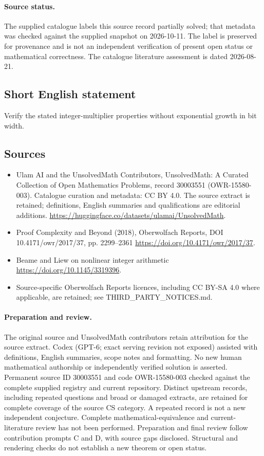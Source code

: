 \documentclass[11pt]{article}
\begin{document}
\paragraph{Source status.}
The supplied catalogue labels this source record partially solved; that metadata was checked against the supplied snapshot on 2026-10-11. The label is preserved for provenance and is not an independent verification of present open status or mathematical correctness. The catalogue literature assessment is dated 2026-08-21.
\subsection{Short English statement}
Verify the stated integer-multiplier properties without exponential growth in bit width.
\subsection{Sources}
\begin{itemize}
\item[S1] Ulam AI and the UnsolvedMath Contributors, UnsolvedMath: A Curated Collection of Open Mathematics Problems, record 30003551 (OWR-15580-003). Catalogue curation and metadata: CC BY 4.0. The source extract is retained; definitions, English summaries and qualifications are editorial additions.
\url{https://huggingface.co/datasets/ulamai/UnsolvedMath}.
\item[S2] Proof Complexity and Beyond (2018), Oberwolfach Reports, DOI 10.4171/owr/2017/37, pp. 2299--2361
\url{https://doi.org/10.4171/owr/2017/37}.
\item[S3] Beame and Liew on nonlinear integer arithmetic
\url{https://doi.org/10.1145/3319396}.
\item Source-specific Oberwolfach Reports licences, including CC BY-SA 4.0 where applicable, are retained; see THIRD\_PARTY\_NOTICES.md.
\end{itemize}
\paragraph{Preparation and review.}
The original source and UnsolvedMath contributors retain attribution for the source extract. Codex (GPT-6; exact serving revision not exposed) assisted with definitions, English summaries, scope notes and formatting. No new human mathematical authorship or independently verified solution is asserted. Permanent source ID 30003551 and code OWR-15580-003 checked against the complete supplied registry and current repository. Distinct upstream records, including repeated questions and broad or damaged extracts, are retained for complete coverage of the source CS category. A repeated record is not a new independent conjecture. Complete mathematical-equivalence and current-literature review has not been performed. Preparation and final review follow contribution prompts C and D, with source gaps disclosed. Structural and rendering checks do not establish a new theorem or open status.
\label{end:30003551}
\end{document}
